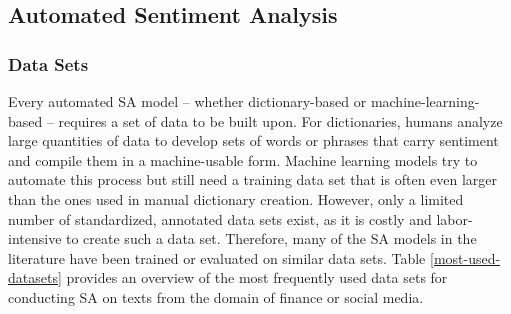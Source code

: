 \subsection{Automated Sentiment Analysis}

\subsubsection{Data Sets}

Every automated SA model -- whether dictionary-based or machine-learning-based -- requires a set of data to be built upon. For dictionaries, humans analyze large quantities of data to develop sets of words or phrases that carry sentiment and compile them in a machine-usable form. Machine learning models try to automate this process but still need a training data set that is often even larger than the ones used in manual dictionary creation. However, only a limited number of standardized, annotated data sets exist, as it is costly and labor-intensive to create such a data set. Therefore, many of the SA models in the literature have been trained or evaluated on similar data sets. Table \ref{most-used-datasets} provides an overview of the most frequently used data sets for conducting SA on texts from the domain of finance or social media.



